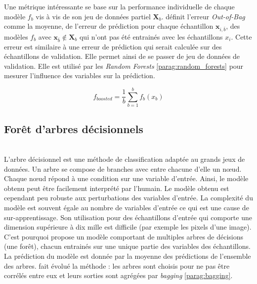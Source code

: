 Une métrique intéressante se base sur la performance individuelle de chaque modèle $f_b$ vis à vis de son jeu de données partiel $\mathbf{X}_b$.
\citeauthor{breiman_bagging_1996} \cite{breiman_bagging_1996} définit l'erreur \textit{Out-of-Bag} comme la moyenne, de l'erreur de prédiction pour chaque échantillon $\mathbf{x}_{i,\bar{b}}$, des modèles $f_b$ avec $ \mathbf{x}_{\bar{b}} \notin \mathbf{X}_b$ qui n'ont pas été entrainés avec les échantillons $x_i$.
Cette erreur est similaire à une erreur de prédiction qui serait calculée sur des échantillons de validation.
Elle permet ainsi de se passer de jeu de données de validation.
Elle est utilisé par les \textit{Random Forests} \ref{parag:random_forests} pour mesurer l'influence des variables sur la prédiction.

\begin{equation} \label{eq:bagging}
f_{boosted} = \frac{1}{b} \sum_{b=1}^{b} f_{b}\left(x_b\right)
\end{equation}

\subsection{Forêt d'arbres décisionnels}\mbox{\label{parag:random_forests}} \\
L'arbre décisionnel est une méthode de classification adaptée au grands jeux de données.
Un arbre se compose de branches avec entre chacune d'elle un nœud.
Chaque nœud répond à une condition sur une variable d'entrée.
Ainsi, le modèle obtenu peut être facilement interprété par l'humain.
Le modèle obtenu est cependant peu robuste aux perturbations des variables d'entrée.
La complexité du modèle est souvent égale au nombre de variables d'entrée ce qui est une cause de sur-apprentissage.
Son utilisation pour des échantillons d'entrée qui comporte une dimension supérieure à dix mille est difficile (par exemple les pixels d'une image).
C'est pourquoi \citeauthor{ho_random_1995}
\cite{ho_random_1995, ho_random_1998} propose un modèle comportant de multiples arbres de décisions (une forêt), chacun entrainés sur une unique partie des variables des échantillons.
La prédiction du modèle est donnée par la moyenne des prédictions de l'ensemble des arbres. 
\citeauthor{breiman_random_2001} \cite{breiman_random_2001} fait évolué la méthode : les arbres sont choisis pour ne pas être corrélés entre eux et leurs sorties sont agrégées par \textit{bagging} \ref{parag:bagging}.

